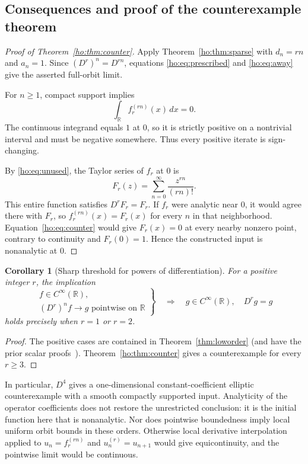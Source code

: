 \documentclass[11pt,reqno]{amsart}
\numberwithin{equation}{section}
\newtheorem{corollary}[theorem]{Corollary}
\theoremstyle{definition}
\theoremstyle{remark}
\newcommand{\R}{\mathbb R}
\begin{document}
\subsection{Consequences and proof of the counterexample theorem}
\begin{proof}[Proof of Theorem~\ref{ho:thm:counter}]
Apply Theorem~\ref{ho:thm:sparse} with $d_n=rn$ and $a_n=1$. Since $(D^r)^n=D^{rn}$, equations \eqref{ho:eq:prescribed} and \eqref{ho:eq:away} give the asserted full-orbit limit.

For $n\ge1$, compact support implies
\[
 \int_\R f_r^{(rn)}(x)\,dx=0.
\]
The continuous integrand equals $1$ at $0$, so it is strictly positive on a nontrivial interval and must be negative somewhere. Thus every positive iterate is sign-changing.

By \eqref{ho:eq:unused}, the Taylor series of $f_r$ at $0$ is
\[
 F_r(z)=\sum_{n=0}^{\infty}\frac{z^{rn}}{(rn)!}.
\]
This entire function satisfies $D^rF_r=F_r$. If $f_r$ were analytic near $0$, it would agree there with $F_r$, so $f_r^{(rn)}(x)=F_r(x)$ for every $n$ in that neighborhood. Equation~\eqref{ho:eq:counter} would give $F_r(x)=0$ at every nearby nonzero point, contrary to continuity and $F_r(0)=1$. Hence the constructed input is nonanalytic at $0$.
\end{proof}

\begin{corollary}[Sharp threshold for powers of differentiation]\label{ho:cor:sharp}
For a positive integer $r$, the implication
\[
 \left.
 \begin{gathered}
 f\in C^\infty(\R),\\
 (D^r)^nf\to g\text{ pointwise on }\R
 \end{gathered}
 \right\}
 \quad\Longrightarrow\quad
 g\in C^\infty(\R),\quad D^rg=g
\]
holds precisely when $r=1$ or $r=2$.
\end{corollary}
\begin{proof}
The positive cases are contained in Theorem~\ref{thm:loworder} (and have the prior scalar proofs~\cite{tao,adams}). Theorem~\ref{ho:thm:counter} gives a counterexample for every $r\ge3$.
\end{proof}

In particular, $D^4$ gives a one-dimensional constant-coefficient elliptic counterexample with a smooth compactly supported input. Analyticity of the operator coefficients does not restore the unrestricted conclusion: it is the initial function here that is nonanalytic. Nor does pointwise boundedness imply local uniform orbit bounds in these orders. Otherwise local derivative interpolation applied to $u_n=f_r^{(rn)}$ and $u_n^{(r)}=u_{n+1}$ would give equicontinuity, and the pointwise limit would be continuous.
\end{document}
